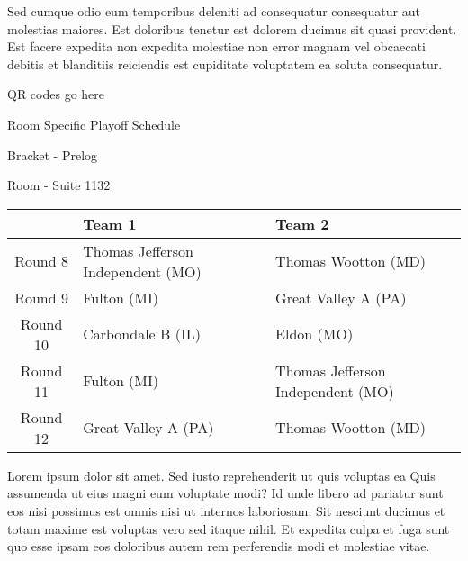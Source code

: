 \documentclass{article}%
\begin{document}
\newline%
Sed cumque odio eum temporibus deleniti ad consequatur consequatur aut molestias maiores. Est doloribus tenetur est dolorem ducimus sit quasi provident. Est facere expedita non expedita molestiae non error magnam vel obcaecati debitis et blanditiis reiciendis est cupiditate voluptatem ea soluta consequatur.%
\vspace*{140pt}%
\begin{center}%
\begin{Huge}%
QR codes go here%
\end{Huge}%
\end{center}%
\newpage%
\begin{center}%
\begin{Huge}%
Room Specific Playoff Schedule%
\end{Huge}%
\vspace*{8pt}%
\linebreak%
\begin{Large}%
Bracket {-} Prelog%
\end{Large}%
\vspace*{8pt}%
\linebreak%
\vspace*{8pt}%
\begin{Large}%
Room {-} Suite 1132%
\end{Large}%
\end{center}%
%
\begin{tabularx}{\textwidth}{|c|Y|Y|}%
\hline%
&Team 1&Team 2\\%
\hline%
Round 8&Thomas Jefferson Independent (MO)&Thomas Wootton (MD)\\%
Round 9&Fulton (MI)&Great Valley A (PA)\\%
Round 10&Carbondale B (IL)&Eldon (MO)\\%
Round 11&Fulton (MI)&Thomas Jefferson Independent (MO)\\%
Round 12&Great Valley A (PA)&Thomas Wootton (MD)\\%
\hline%
\end{tabularx}%
\vspace*{8pt}%
\newline%
Lorem ipsum dolor sit amet. Sed iusto reprehenderit ut quis voluptas ea Quis assumenda ut eius magni eum voluptate modi? Id unde libero ad pariatur sunt eos nisi possimus est omnis nisi ut internos laboriosam. Sit nesciunt ducimus et totam maxime est voluptas vero sed itaque nihil. Et expedita culpa et fuga sunt quo esse ipsam eos doloribus autem rem perferendis modi et molestiae vitae.\newline%
\end{document}
